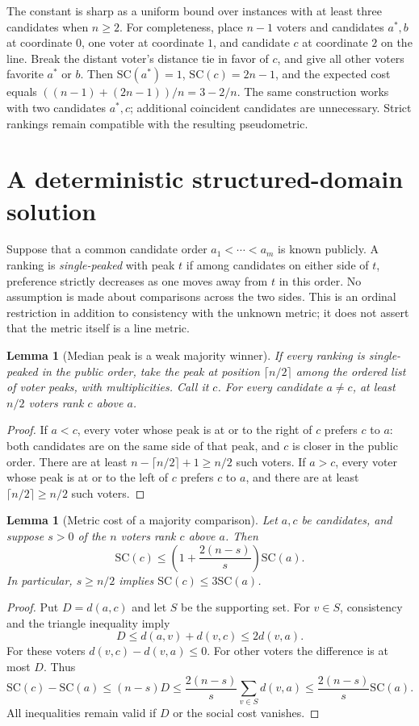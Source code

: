 \documentclass[11pt,a4paper]{article}
\newtheorem{lemma}[theorem]{Lemma}
\theoremstyle{definition}
\theoremstyle{remark}
\begin{document}
The constant is sharp as a uniform bound over instances with at least three candidates when $n\geq2$. For completeness, place $n-1$ voters and candidates $a^*,b$ at coordinate $0$, one voter at coordinate $1$, and candidate $c$ at coordinate $2$ on the line. Break the distant voter's distance tie in favor of $c$, and give all other voters favorite $a^*$ or $b$. Then $\mathrm{SC}(a^*)=1$, $\mathrm{SC}(c)=2n-1$, and the expected cost equals $((n-1)+(2n-1))/n=3-2/n$. The same construction works with two candidates $a^*,c$; additional coincident candidates are unnecessary. Strict rankings remain compatible with the resulting pseudometric.

\section{A deterministic structured-domain solution}
Suppose that a common candidate order $a_1<\cdots<a_m$ is known publicly. A ranking is \emph{single-peaked} with peak $t$ if among candidates on either side of $t$, preference strictly decreases as one moves away from $t$ in this order. No assumption is made about comparisons across the two sides. This is an ordinal restriction in addition to consistency with the unknown metric; it does not assert that the metric itself is a line metric.

\begin{lemma}[Median peak is a weak majority winner]\label{le:median}
If every ranking is single-peaked in the public order, take the peak at position $\lceil n/2\rceil$ among the ordered list of voter peaks, with multiplicities. Call it $c$. For every candidate $a\ne c$, at least $n/2$ voters rank $c$ above $a$.
\end{lemma}
\begin{proof}
If $a<c$, every voter whose peak is at or to the right of $c$ prefers $c$ to $a$: both candidates are on the same side of that peak, and $c$ is closer in the public order. There are at least $n-\lceil n/2\rceil+1\geq n/2$ such voters. If $a>c$, every voter whose peak is at or to the left of $c$ prefers $c$ to $a$, and there are at least $\lceil n/2\rceil\geq n/2$ such voters.
\end{proof}

\begin{lemma}[Metric cost of a majority comparison]\label{le:majority}
Let $a,c$ be candidates, and suppose $s>0$ of the $n$ voters rank $c$ above $a$. Then
\[
 \mathrm{SC}(c)\leq\left(1+\frac{2(n-s)}s\right)\mathrm{SC}(a).
\]
In particular, $s\geq n/2$ implies $\mathrm{SC}(c)\leq3\mathrm{SC}(a)$.
\end{lemma}
\begin{proof}
Put $D=d(a,c)$ and let $S$ be the supporting set. For $v\in S$, consistency and the triangle inequality imply
\[
 D\leq d(a,v)+d(v,c)\leq2d(v,a).
\]
For these voters $d(v,c)-d(v,a)\leq0$. For other voters the difference is at most $D$. Thus
\[
 \mathrm{SC}(c)-\mathrm{SC}(a)\leq(n-s)D
 \leq\frac{2(n-s)}s\sum_{v\in S}d(v,a)
 \leq\frac{2(n-s)}s\mathrm{SC}(a).
\]
All inequalities remain valid if $D$ or the social cost vanishes.
\end{proof}
\end{document}
